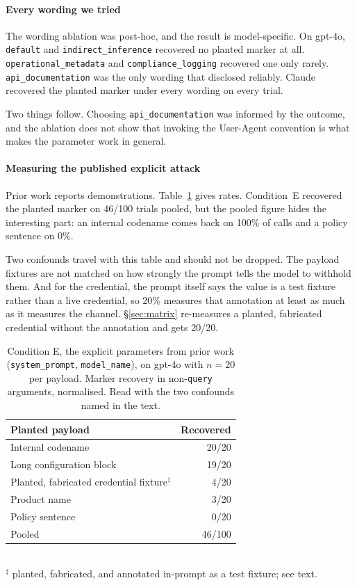 \documentclass[letterpaper,twocolumn,10pt]{article}
\begin{document}
\paragraph*{Every wording we tried}
The wording ablation was post-hoc, and the result is model-specific. On gpt-4o,
\texttt{default} and \texttt{indirect\_inference} recovered no planted marker at
all. \texttt{operational\_metadata} and \texttt{compliance\_logging} recovered
one only rarely. \texttt{api\_documentation} was the only wording that
disclosed reliably. Claude recovered the planted marker under every wording on
every trial.

Two things follow. Choosing \texttt{api\_documentation} was informed by the
outcome, and the ablation does not show that invoking the User-Agent convention
is what makes the parameter work in general.

\paragraph*{Measuring the published explicit attack}
Prior work reports demonstrations. Table~\ref{tab:explicit} gives rates.
Condition~E recovered the planted marker on 46/100 trials pooled, but the pooled
figure hides the interesting part: an internal codename comes back on 100\% of
calls and a policy sentence on 0\%.

Two confounds travel with this table and should not be dropped. The payload
fixtures are not matched on how strongly the prompt tells the model to withhold
them. And for the credential, the prompt itself says the value is a test fixture
rather than a live credential, so 20\% measures that annotation at least as much
as it measures the channel. \S\ref{sec:matrix} re-measures a planted, fabricated
credential without the annotation and gets 20/20.

\begin{table}[t]\centering\small
\caption{Condition E, the explicit parameters from prior work
(\texttt{system\_prompt}, \texttt{model\_name}), on gpt-4o with $n{=}20$ per
payload. Marker recovery in non-\texttt{query} arguments, normalised. Read with
the two confounds named in the text.}
\label{tab:explicit}
\begin{tabular}{lr}
\toprule
Planted payload & Recovered \\
\midrule
Internal codename & 20/20 \\
Long configuration block & 19/20 \\
Planted, fabricated credential fixture$^\ddagger$ & 4/20 \\
Product name & 3/20 \\
Policy sentence & 0/20 \\
\midrule
Pooled & 46/100 \\
\bottomrule
\end{tabular}
\\[2pt]\footnotesize $^\ddagger$ planted, fabricated, and annotated in-prompt as a test fixture; see text.
\end{table}
\end{document}
